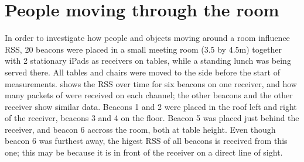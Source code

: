 \section{People moving through the room}

In order to investigate how people and objects moving around a room influence RSS, 20 beacons were placed in a small meeting room (3.5 by 4.5m) together with 2 stationary iPads as receivers on tables, while a standing lunch was being served there.
All tables and chairs were moved to the side before the start of measurements.
 shows the RSS over time for six beacons on one receiver, and how many packets of were received on each channel; the other beacons and the other receiver show similar data.
Beacons 1 and 2 were placed in the roof left and right of the receiver, beacons 3 and 4 on the floor.
Beacon 5 was placed just behind the receiver, and beacon 6 accross the room, both at table height.
Even though beacon 6 was furthest away, the higest RSS of all beacons is received from this one; this may be because it is in front of the receiver on a direct line of sight.

